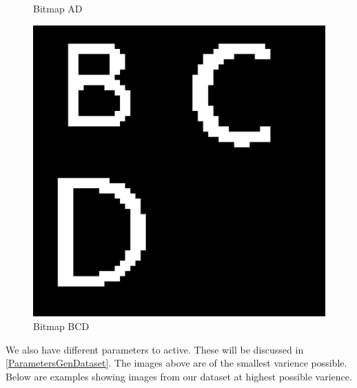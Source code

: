\begin{figure}[!htb]
      \caption{Bitmap AD}
      \label{Bitmap-AD}
    \endminipage\hfill
      \includegraphics[width=\linewidth]{figures/Bitmap-BCD}
      \caption{Bitmap BCD} 
      \label{Bitmap-BCD}
    \endminipage
\end{figure}

We also have different parameters to active. These will be discussed in \ref{ParametersGenDataset}. 
The images above are of the smallest varience possible. Below are examples showing images 
from our dataset at highest possible varience.

